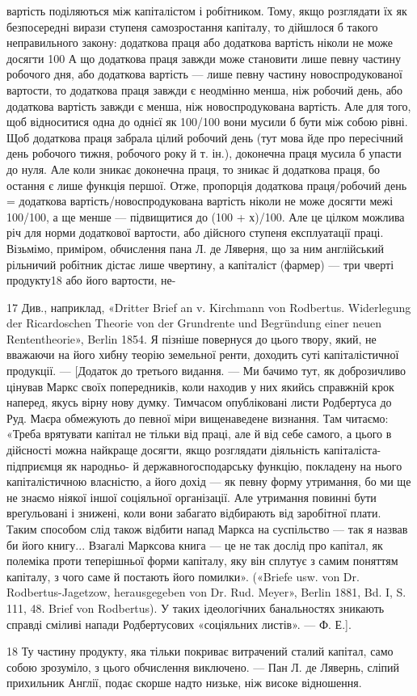 вартість поділяються між капіталістом і робітником. Тому, якщо
розглядати їх як безпосередні вирази ступеня самозростання
капіталу, то дійшлося б такого неправильного закону: додаткова
праця або додаткова вартість ніколи не може досягти 100%
А що додаткова праця завжди може становити лише певну частину
робочого дня, або додаткова вартість — лише певну частину
новоспродукованої вартости, то додаткова праця завжди є неодмінно
менша, ніж робочий день, або додаткова вартість завжди
є менша, ніж новоспродукована вартість. Але для того, щоб
відноситися одна до однієї як 100/100 вони мусили б бути між собою
рівні. Щоб додаткова праця забрала цілий робочий день (тут
мова йде про пересічний день робочого тижня, робочого року
й т. ін.), доконечна праця мусила б упасти до нуля. Але коли
зникає доконечна праця, то зникає й додаткова праця, бо остання
є лише функція першої. Отже, пропорція додаткова праця/робочий день =
додаткова вартість/новоспродукована вартість ніколи не може досягти межі
100/100, а ще менше — підвищитися до (100 + х)/100. Але це цілком можлива річ
для норми додаткової вартости, або дійсного ступеня експлуатації
праці. Візьмімо, приміром, обчислення пана Л. де Ляверня,
що за ним англійський рільничий робітник дістає лише чвертину,
а капіталіст (фармер) — три чверті продукту18 або його вартости, не-

17 Див., наприклад, «Dritter Brief an v. Kirchmann von Rodbertus.
Widerlegung der Ricardoschen Theorie von der Grundrente und Begründung
einer neuen Rententheorie», Berlin 1854. Я пізніше повернуся
до цього твору, який, не вважаючи на його хибну теорію земельної ренти,
доходить суті капіталістичної продукції. — [Додаток до третього видання.
— Ми бачимо тут, як доброзичливо цінував Маркс своїх попередників,
коли находив у них якийсь справжній крок наперед, якусь вірну
нову думку. Тимчасом опубліковані листи Родбертуса до Руд. Маєра
обмежують до певної міри вищенаведене визнання. Там читаємо: «Треба
врятувати капітал не тільки від праці, але й від себе самого, а цього в
дійсності можна найкраще досягти, якщо розглядати діяльність капіталіста-підприємця як народньо- й
державногосподарську функцію,
покладену на нього капіталістичною власністю, а його дохід — як певну
форму утримання, бо ми ще не знаємо ніякої іншої соціяльної організації.
Але утримання повинні бути вреґульовані і знижені, коли вони
забагато відбирають від заробітної плати. Таким способом слід також
відбити напад Маркса на суспільство — так я назвав би його книгу...
Взагалі Марксова книга — це не так дослід про капітал, як полеміка
проти теперішньої форми капіталу, яку він сплутує з самим поняттям
капіталу, з чого саме й постають його помилки». («Briefe usw. von Dr.
Rodbertus-Jagetzow, herausgegeben von Dr. Rud. Meyer», Berlin 1881,
Bd. I, S. 111, 48. Brief von Rodbertus). У таких ідеологічних банальностях
зникають справді сміливі напади Родбертусових «соціяльних листів».
— Ф. Е.].

18 Ту частину продукту, яка тільки покриває витрачений сталий
капітал, само собою зрозуміло, з цього обчислення виключено. — Пан
Л. де Лявернь, сліпий прихильник Англії, подає скорше надто низьке,
ніж високе відношення.
